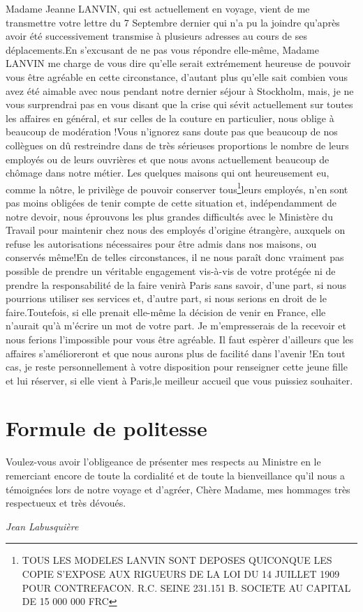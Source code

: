 \documentclass[12pt,a4paper]{article}
\begin{document}
Madame Jeanne LANVIN, qui est actuellement en voyage, vient de me transmettre votre lettre du 7 Septembre dernier qui n'a pu la joindre qu'après avoir été successivement transmise à plusieurs adresses au cours de ses déplacements.En s'excusant de ne pas vous répondre elle-même, Madame LANVIN me charge de vous dire qu'elle serait extrémement heureuse de pouvoir vous être agréable en cette circonstance, d'autant plus qu'elle sait combien vous avez été aimable avec nous pendant notre dernier séjour à Stockholm, mais, je ne vous surprendrai pas en vous disant que la crise qui sévit actuellement sur toutes les affaires en général, et sur celles de la couture en particulier, nous oblige à beaucoup de modération !Vous n'ignorez sans doute pas que beaucoup de nos collègues on dû restreindre dans de très sérieuses proportions le nombre de leurs employés ou de leurs ouvrières et que nous avons actuellement beaucoup de chômage dans notre métier. Les quelques maisons qui ont heureusement eu, comme la nôtre, le privilège de pouvoir conserver tous\footnote{TOUS LES MODELES LANVIN SONT DEPOSES QUICONQUE LES COPIE S'EXPOSE AUX RIGUEURS DE LA LOI DU 14 JUILLET 1909 POUR CONTREFACON. R.C. SEINE 231.151 B. SOCIETE AU CAPITAL DE 15 000 000 FRC}leurs employés, n'en sont pas moins obligées de tenir compte de cette situation et, indépendamment de notre devoir, nous éprouvons les plus grandes difficultés avec le Ministère du Travail pour maintenir chez nous des employés d'origine étrangère, auxquels on refuse les autorisations nécessaires pour être admis dans nos maisons, ou conservés même!En de telles circonstances, il ne nous paraît donc vraiment pas possible de prendre un véritable engagement vis-à-vis de votre protégée ni de prendre la responsabilité de la faire venirà Paris sans savoir, d'une part, si nous pourrions utiliser ses services et, d'autre part, si nous serions en droit de le faire.Toutefois, si elle prenait elle-même la décision de venir en France, elle n'aurait qu'à m'écrire un mot de votre part. Je m'empresserais de la recevoir et nous ferions l'impossible pour vous être agréable. Il faut espèrer d'ailleurs que les affaires s'amélioreront et que nous aurons plus de facilité dans l'avenir !En tout cas, je reste personnellement à votre disposition pour renseigner cette jeune fille et lui réserver, si elle vient à Paris,le meilleur accueil que vous puissiez souhaiter.

\section{Formule de politesse}Voulez-vous avoir l'obligeance de présenter mes respects au Ministre en le remerciant encore de toute la cordialité et de toute la bienveillance qu'il nous a témoignées lors de notre voyage et d'agréer, Chère Madame, mes hommages très respectueux et très dévoués.

\begin{flushright}
\textit{Jean Labusquière}
\end{flushright}
\end{document}

